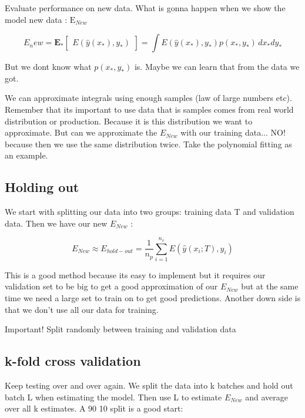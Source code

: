 Evaluate performance on new data. What is gonna happen when we show the model new data : $\text{E}_{New}$ 

\begin{equation}
E_new = \textbf{E}_*\begin{bmatrix} E(\hat{y}(x_*),y_*) \end{bmatrix} = \int E(\hat{y}(x_*),y_*)p(x_*,y_*) \,dx_*dy_*
\end{equation}

But we dont know what $p(x_*,y_*)$ is. Maybe we can learn that from the data we got. 

We can approximate integrals using enough samples (law of large numbers etc). Remember that its important to use data that is samples comes from real world distribution or production. Because it is this distribution we want to approximate. But can we approximate the $E_{New}$ with our training data... NO! because then we use the same distribution twice. Take the polynomial fitting as an example. 

\subsection*{Holding out}
We start with splitting our data into two groups: training data T and validation data. Then we have our new $E_{New}$ : 

\begin{equation}
E_{New} \approx E_{hold-out} = \frac{1} {n_p} \sum_{i=1}^{n_v} E(\hat{y}(x_i;T),y_i) 
\end{equation}

This is a good method because its easy to implement but it requires our validation set to be big to get a good approximation of our $E_{New}$ but at the same time we need a large set to train on to get good predictions. Another down side is that we don't use all our data for training. 

\begin{definition}{Important! }
Split randomly between training and validation data
\end{definition}

\subsection*{k-fold cross validation}
Keep testing over and over again. We split the data into k batches and hold out batch L when estimating the model. Then use L to estimate $E_{New}$ and average over all k estimates. A 90 10 split is a good start:

